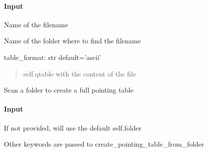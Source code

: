 \documentclass[letterpaper,10pt,english]{sphinxmanual}
\begin{document}
\begin{fulllineitems}
\begin{fulllineitems}
\paragraph{Input}
\label{\detokenize{api/pymusepipe:id124}}\begin{description}
\sphinxAtStartPar
Name of the filename

\sphinxAtStartPar
Name of the folder where to find the filename

\end{description}

\sphinxAtStartPar
table\_format: str default=’ascii’
\begin{quote}\begin{description}
\sphinxAtStartPar
self.qtable with the content of the file

\end{description}\end{quote}

\end{fulllineitems}


\begin{fulllineitems}
\label{\detokenize{api/pymusepipe:pymusepipe.util_image.PointingTable.scan_folder}}
\pysigstartsignatures
{}
\pysigstopsignatures
\sphinxAtStartPar
Scan a folder to create a full pointing table


\paragraph{Input}
\label{\detokenize{api/pymusepipe:id125}}\begin{description}
\sphinxAtStartPar
If not provided, will use the default self.folder

\sphinxAtStartPar
Other keywords are passed to create\_pointing\_table\_from\_folder

\end{description}



\end{fulllineitems}
\end{fulllineitems}
\end{document}
